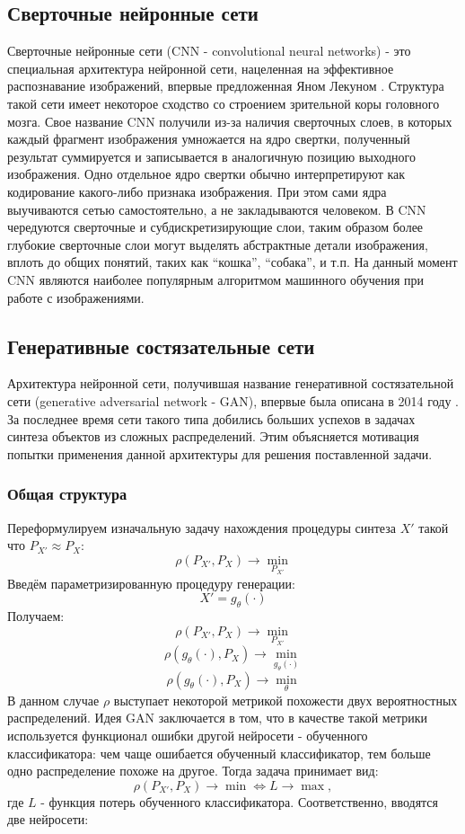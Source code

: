 	\subsection{Сверточные нейронные сети}
		Сверточные нейронные сети (CNN - convolutional neural networks) - это специальная архитектура нейронной сети, нацеленная на эффективное распознавание изображений, впервые предложенная Яном Лекуном \cite{LeCun}. Структура такой сети имеет некоторое сходство со строением зрительной коры головного мозга. Свое название CNN получили из-за наличия сверточных слоев, в которых каждый фрагмент изображения умножается на ядро свертки, полученный результат суммируется и записывается в аналогичную позицию выходного изображения. Одно отдельное ядро свертки обычно интерпретируют как кодирование какого-либо признака изображения. При этом сами ядра выучиваются сетью самостоятельно, а не закладываются человеком. В CNN чередуются сверточные и субдискретизирующие слои, таким образом более глубокие сверточные слои могут выделять абстрактные детали изображения, вплоть до общих понятий, таких как ``кошка'', ``собака'', и т.п. На данный момент CNN являются наиболее популярным алгоритмом машинного обучения при работе с изображениями.
	\subsection{Генеративные состязательные сети}
		Архитектура нейронной сети, получившая название генеративной состязательной сети (generative adversarial network - GAN), впервые была описана в 2014 году \cite{Goodfellow}. За последнее время сети такого типа добились больших успехов в задачах синтеза объектов из сложных распределений. Этим объясняется мотивация попытки применения данной архитектуры для решения поставленной задачи.
		\subsubsection{Общая структура}
			Переформулируем изначальную задачу нахождения процедуры синтеза $X'$ такой что $ P_{X'} \approx P_X$:
			$$ \rho(P_{X'}, P_X) \longrightarrow \underset{P_{X'}}{\min} $$
			Введём параметризированную процедуру генерации:
			$$ X' = g_{\theta}(\cdot) $$
			Получаем:
			$$ \rho(P_{X'}, P_X) \longrightarrow \underset{P_{X'}}{\min} $$
			$$ \rho(g_{\theta}(\cdot), P_X) \longrightarrow \underset{g_{\theta}(\cdot)}{\min} $$
			$$ \rho(g_{\theta}(\cdot), P_X) \longrightarrow \underset{\theta}{\min} $$
			В данном случае $\rho$ выступает некоторой метрикой похожести двух вероятностных распределений.
			Идея GAN заключается в том, что в качестве такой метрики используется функционал ошибки другой нейросети -  обученного классификатора: чем чаще ошибается обученный классификатор, тем больше одно распределение похоже на другое. Тогда задача принимает вид:
			$$ \rho(P_{X'}, P_X) \longrightarrow \min \Leftrightarrow L \longrightarrow \max, $$
			где $L$ - функция потерь обученного классификатора.
			Соответственно, вводятся две нейросети:
	
